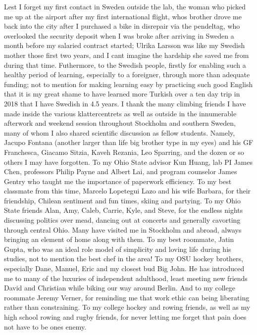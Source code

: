 Lest I forget my first contact in Sweden outside the lab, the woman who picked me up at the airport after my first international flight, whos brother drove me back into the city after I purchased a bike in disrepair via the pendeltag, who overlooked the security deposit when I was broke after arriving in Sweden a month before my salaried contract started; Ulrika Larsson was like my Swedish mother those first two years, and I cant imagine the hardship she saved me from during that time. Futhermore, to the Swedish people, firstly for enabling such a healthy period of learning, especially to a foreigner, through more than adequate funding; not to mention for making learning easy by practicing such good English that it is my great shame to have learned more Turkish over a ten day trip in 2018 that I have Swedish in 4.5 years.
I thank the many climbing friends I have made inside the various klattercentrets as well as outside in the innumerable afterwork and weekend session throughout Stockholm and southern Sweden, many of whom I also shared scientific discussion as fellow students. Namely, Jacupo Fontana (another larger than life big brother type in my eyes) and his GF Franchesca, Giacamo Sitzia, Kaveh Rezania, Leo Sparring, and the dozen or so others I may have forgotten.
To my Ohio State advisor Kun Huang, lab PI James Chen, professors Philip Payne and Albert Lai, and program counselor James Gentry who taught me the importance of paperwork efficiency. To my best classmate from this time, Marcelo Lopetegui Lazo and his wife Barbara, for their friendship, Chilean sentiment and fun times, skiing and partying. To my Ohio State friends Alan, Amy, Caleb, Carrie, Kyle, and Steve, for the endless nights discussing politics over mead, dancing out at concerts and generally cavorting through central Ohio. Many have visited me in Stockholm and abroad, always bringing an element of home along with them. To my best roommate, Jatin Gupta, who was an ideal role model of simplicity and loving life during his studies, not to mention the best chef in the area! To my OSU hockey brothers, especially Dane, Manuel, Eric and my closest bud Big John. He has introduced me to many of the luxuries of independent adulthood, least meeting new friends David and Christian while biking our way around Berlin. And to my college roommate Jeremy Verner, for reminding me that work ethic can being liberating rather than constraining. To my college hockey and rowing friends, as well as my high school rowing and rugby friends, for never letting me forget that pain does not have to be ones enemy.
